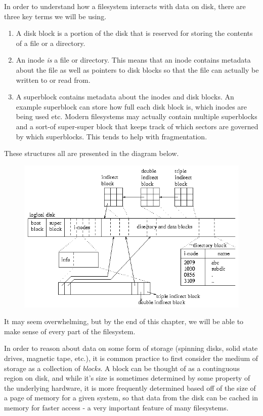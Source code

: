In order to understand how a filesystem interacts with data on disk, there are three key terms we will be using.
\begin{enumerate}
  \item {} A disk block is a portion of the disk that is reserved for storing the contents of a file or a directory.
  \item {} An inode \emph{is} a file or directory. This means that an inode contains metadata about the file as well as pointers to disk blocks so that the file can actually be written to or read from.
  \item {} A superblock contains metadata about the inodes and disk blocks. An example superblock can store how full each disk block is, which inodes are being used etc. Modern filesystems may actually contain multiple superblocks and a sort-of super-super block that keeps track of which sectors are governed by which superblocks. This tends to help with fragmentation.
\end{enumerate}

These structures all are presented in the diagram below.

\begin{figure}[htbp]
\centering
\includegraphics[width=.8\textwidth]{filesystems/images/disk.gif}
\caption{}
\end{figure}

It may seem overwhelming, but by the end of this chapter, we will be able to make sense of every part of the filesystem.

In order to reason about data on some form of storage (spinning disks, solid state drives, magnetic tape, etc.), it is common practice to first consider the medium of storage as a collection of \emph{blocks}. A block can be thought of as a continguous region on disk, and while it's size is sometimes determined by some property of the underlying hardware, it is more frequently determined based off of the size of a page of memory for a given system, so that data from the disk can be cached in memory for faster access - a very important feature of many filesystems.

